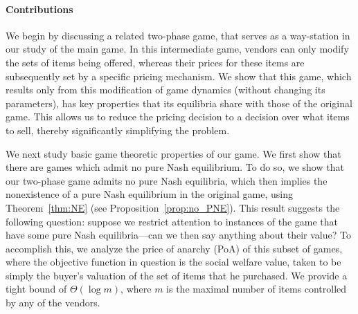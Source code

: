 \paragraph{Contributions}
We begin by discussing a related two-phase game, that serves as a
way-station in our study of the main game. In this intermediate
game, vendors can only modify the sets of items being offered,
whereas their prices for these items are subsequently set by a specific pricing
mechanism. We show that this game, which results only from this
modification of game dynamics (without changing its
parameters), has key properties that its equilibria share with those of the
original game. This allows us to reduce the pricing decision to a decision over what items to
sell, thereby significantly simplifying the problem.



We next study basic game theoretic properties of our game. We first show
that there are games which admit no pure Nash equilibrium. To do
so, we show that our two-phase game admits no pure Nash
equilibria, which then implies the nonexistence of a pure Nash
equilibrium in the original game, using Theorem~\ref{thm:NE}
(see Proposition~\ref{prop:no_PNE}).  This result suggests the
following question: suppose we restrict attention to instances of the game
that have some pure Nash equilibria---can we then say anything about
their value?  To accomplish this, we analyze the price of anarchy
(PoA) of this subset of games, where the objective function in
question is the social welfare value, taken to be simply the buyer's
valuation of the set of items that he purchased. We provide a tight
bound of $\Theta(\log m)$, where $m$ is the maximal number of items
controlled by any of the vendors.

